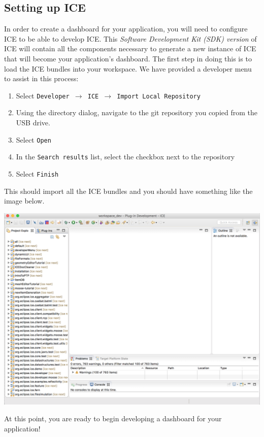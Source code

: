 \subsection{Setting up ICE}
In order to create a dashboard for your application, you will need to configure ICE to
be able to develop ICE. This \textit{Software Development Kit (SDK) version} of
ICE will contain all the components necessary to generate a new instance of ICE that will become your application's dashboard. 
The first step in doing this is to load the ICE bundles into
your workspace. We have provided a developer menu to assist in this process:

\begin{enumerate}
\item Select \texttt{Developer $\rightarrow$ ICE $\rightarrow$
Import Local Repository}
\item Using the directory dialog, navigate to the git repository you copied
from the USB drive.
\item Select \texttt{Open}
\item In the \texttt{Search results} list, select the checkbox next to the
repository
\item Select \texttt{Finish}
\end{enumerate}

This should import all the ICE bundles and you should have something
like the image below.
\begin{center} \includegraphics[width=\textwidth]{figures/cloned} \end{center}

At this point, you are ready to begin developing a dashboard for your
application!
